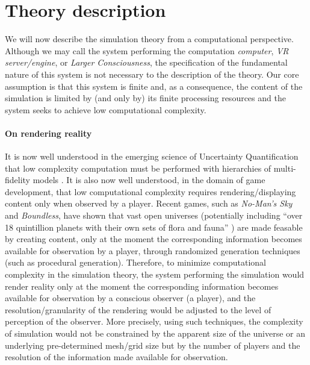 \documentclass[11pt]{article}
\theoremstyle{definition}
\begin{document}
\section{Theory description }
We will now describe the simulation theory from a computational perspective. Although we may call the system performing the computation \emph{computer}, \emph{VR server/engine}, or \emph{Larger Consciousness}, the specification of the fundamental nature of this system is not necessary to the description of the theory. Our core assumption is that this system is finite and, as a consequence, the content of the simulation is limited  by (and only by) its finite processing resources and the system seeks to achieve low computational complexity.


\paragraph{On rendering reality}
It is now well understood in the emerging science of Uncertainty Quantification \cite{handbookofuq2017} that low complexity computation
must be performed with hierarchies of multi-fidelity models \cite{multifidmod2016}.
It is also now well understood, in the domain of game development,  that low computational complexity requires rendering/displaying content only when observed by a player. Recent games, such as \emph{No-Man's Sky} and \emph{Boundless}, have shown that vast open universes (potentially including ``over 18 quintillion planets with their own sets of flora and fauna'' \cite{Ravicnn2015}) are made feasable by creating content, only at the moment the corresponding information becomes available for observation
 by a player, through randomized generation techniques (such as procedural generation).
Therefore, to minimize computational complexity in the simulation theory,  the system performing the simulation would render reality only at the moment the corresponding information becomes available for observation  by a conscious observer (a player), and the resolution/granularity of the rendering would be adjusted to the level of perception of the observer. More precisely, using such techniques, the complexity of simulation would not be constrained by  the apparent size of the universe or an underlying pre-determined  mesh/grid size  \cite{Beaneal2014} but by the number of players and the resolution of the information made available for observation.
\end{document}
